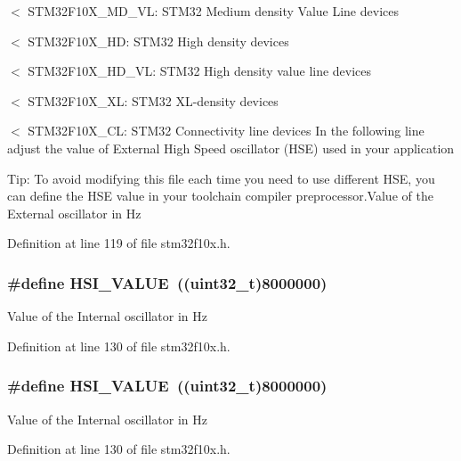 $<$ S\+T\+M32\+F10\+X\+\_\+\+M\+D\+\_\+\+VL\+: S\+T\+M32 Medium density Value Line devices

$<$ S\+T\+M32\+F10\+X\+\_\+\+HD\+: S\+T\+M32 High density devices

$<$ S\+T\+M32\+F10\+X\+\_\+\+H\+D\+\_\+\+VL\+: S\+T\+M32 High density value line devices

$<$ S\+T\+M32\+F10\+X\+\_\+\+XL\+: S\+T\+M32 X\+L-\/density devices

$<$ S\+T\+M32\+F10\+X\+\_\+\+CL\+: S\+T\+M32 Connectivity line devices In the following line adjust the value of External High Speed oscillator (H\+SE) used in your application

Tip\+: To avoid modifying this file each time you need to use different H\+SE, you can define the H\+SE value in your toolchain compiler preprocessor.\+Value of the External oscillator in Hz 

Definition at line 119 of file stm32f10x.\+h.

\subsubsection[{\texorpdfstring{H\+S\+I\+\_\+\+V\+A\+L\+UE}{HSI_VALUE}}]{\setlength{\rightskip}{0pt plus 5cm}\#define H\+S\+I\+\_\+\+V\+A\+L\+UE~(({\bf uint32\+\_\+t})8000000)}\hypertarget{group___library__configuration__section_gaaa8c76e274d0f6dd2cefb5d0b17fbc37}{}\label{group___library__configuration__section_gaaa8c76e274d0f6dd2cefb5d0b17fbc37}
Value of the Internal oscillator in Hz 

Definition at line 130 of file stm32f10x.\+h.

\subsubsection[{\texorpdfstring{H\+S\+I\+\_\+\+V\+A\+L\+UE}{HSI_VALUE}}]{\setlength{\rightskip}{0pt plus 5cm}\#define H\+S\+I\+\_\+\+V\+A\+L\+UE~(({\bf uint32\+\_\+t})8000000)}\hypertarget{group___library__configuration__section_gaaa8c76e274d0f6dd2cefb5d0b17fbc37}{}\label{group___library__configuration__section_gaaa8c76e274d0f6dd2cefb5d0b17fbc37}
Value of the Internal oscillator in Hz 

Definition at line 130 of file stm32f10x.\+h.

